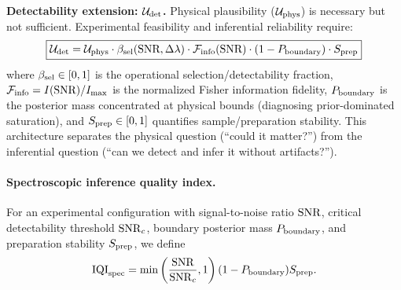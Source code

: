 \documentclass[twocolumn,10pt]{article}
\begin{document}
\textbf{Detectability extension: $\mathcal{U}_{\rm det}$.}
Physical plausibility ($\mathcal{U}_{\rm phys}$) is necessary but not sufficient. 
Experimental feasibility and inferential reliability require:
\begin{equation}
\boxed{
\mathcal{U}_{\rm det}
=
\mathcal{U}_{\rm phys}
\cdot
\beta_{\rm sel}(\text{SNR},\Delta\lambda)
\cdot
\mathcal{F}_{\rm info}(\text{SNR})
\cdot
(1-P_{\rm boundary})
\cdot
S_{\rm prep}
}
\label{eq:U_det}
\end{equation}
where $\beta_{\rm sel}\in[0,1]$ is the operational selection/detectability fraction, 
$\mathcal{F}_{\rm info} = I(\text{SNR})/I_{\max}$ is the normalized Fisher information fidelity,
$P_{\rm boundary}$ is the posterior mass concentrated at physical bounds (diagnosing prior-dominated saturation),
and $S_{\rm prep}\in[0,1]$ quantifies sample/preparation stability.
This architecture separates the physical question (``could it matter?'') from the inferential question (``can we detect and infer it without artifacts?'').

\paragraph{Spectroscopic inference quality index.}
For an experimental configuration with signal-to-noise ratio ${\rm SNR}$, critical detectability threshold ${\rm SNR}_c$, boundary posterior mass $P_{\rm boundary}$, and preparation stability $S_{\rm prep}$, we define
\[
{\rm IQI}_{\rm spec}
=
\min\left(\frac{{\rm SNR}}{{\rm SNR}_c},1\right)
(1-P_{\rm boundary})S_{\rm prep}.
\]
\end{document}
